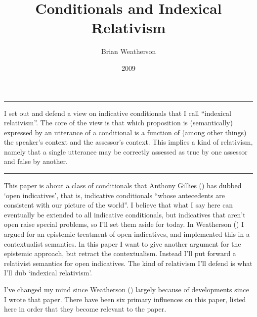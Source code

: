 \documentclass[
  10pt,
  letterpaper,
  DIV=11,
  numbers=noendperiod,
  twoside]{scrartcl}
\title{Conditionals and Indexical Relativism}
\author{Brian Weatherson}
\date{2009}
\renewenvironment{abstract}
 {\vspace{-1.25cm}
 \quotation\small\noindent\rule{\linewidth}{.5pt}\par\smallskip
 \noindent }
 {\par\noindent\rule{\linewidth}{.5pt}\endquotation}
\begin{document}
\maketitle
\begin{abstract}
I set out and defend a view on indicative conditionals that I call
``indexical relativism''. The core of the view is that which proposition
is (semantically) expressed by an utterance of a conditional is a
function of (among other things) the speaker's context and the
assessor's context. This implies a kind of relativism, namely that a
single utterance may be correctly assessed as true by one assessor and
false by another.
\end{abstract}

This paper is about a class of conditionals that Anthony Gillies
() has dubbed `open indicatives',
that is, indicative conditionals ``whose antecedents are consistent with
our picture of the world''. I believe that what I say here can
eventually be extended to all indicative conditionals, but indicatives
that aren't open raise special problems, so I'll set them aside for
today. In Weatherson () I
argued for an epistemic treatment of open indicatives, and implemented
this in a contextualist semantics. In this paper I want to give another
argument for the epistemic approach, but retract the contextualism.
Instead I'll put forward a relativist semantics for open indicatives.
The kind of relativism I'll defend is what I'll dub `indexical
relativism'.

I've changed my mind since Weatherson
() largely because of
developments since I wrote that paper. There have been six primary
influences on this paper, listed here in order that they become relevant
to the paper.
\end{document}
